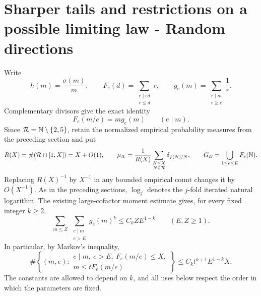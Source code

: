 
\section{Sharper tails and restrictions on a possible limiting law - Random directions}
\label{sec:fraiture-distribution-addendum}

Write
\[
 h(m)=\frac{\sigma(m)}m,
 \qquad
 F_e(d)=\sum_{\substack{r\mid ed\\r\leq d}}r,
 \qquad
 g_e(m)=\sum_{\substack{r\mid m\\r\geq e}}\frac1r.
\]
Complementary divisors give the exact identity
\begin{equation}
 F_e(m/e)=m g_e(m)
 \qquad(e\mid m).
 \label{eq:addendum-reflection}
\end{equation}
Since $\mathcal R=\mathbb N\setminus\{2,5\}$, retain the normalized empirical
probability measures from the preceding section and put
\[
 R(X)=\#(\mathcal R\cap[1,X])=X+O(1),
 \qquad
 \mu_X=\frac1{R(X)}
       \sum_{\substack{N\leq X\\N\in\mathcal R}}
          \delta_{f(N)/N},
 \qquad
 G_E=\bigcup_{1\leq e\leq E}F_e(\mathbb N).
\]
Replacing $R(X)^{-1}$ by $X^{-1}$ in any bounded empirical count
changes it by $O(X^{-1})$.
As in the preceding sections, $\log_j$ denotes the $j$-fold iterated
natural logarithm.  The existing large-cofactor moment estimate gives,
for every fixed integer $k\geq2$,
\begin{equation}
 \sum_{m\leq Z}\ \sum_{\substack{e\mid m\\e>E}}g_e(m)^k
 \leq C_kZE^{1-k}
 \qquad(E,Z\geq1).
 \label{eq:addendum-large-cofactor-moment}
\end{equation}
In particular, by Markov's inequality,
\begin{equation}
 \#\left\{(m,e):
  \begin{array}{c}
   e\mid m,\ e>E,\ F_e(m/e)\leq X,\\
   m\leq tF_e(m/e)
  \end{array}\right\}
 \leq C_kt^{k+1}E^{1-k}X.
 \label{eq:addendum-large-cofactor-witnesses}
\end{equation}
The constants are allowed to depend on $k$, and all uses below respect
the order in which the parameters are fixed.


